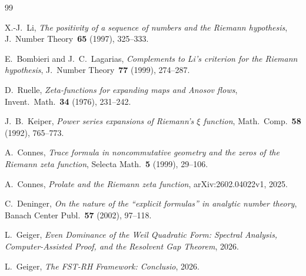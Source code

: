 \documentclass[12pt,a4paper]{article}
\theoremstyle{definition}
\theoremstyle{remark}
\begin{document}
\begin{thebibliography}{99}

X.-J.~Li, \emph{The positivity of a sequence of numbers and the Riemann hypothesis}, J.~Number Theory~\textbf{65} (1997), 325--333.

E.~Bombieri and J.~C.~Lagarias, \emph{Complements to Li's criterion for the Riemann hypothesis}, J.~Number Theory~\textbf{77} (1999), 274--287.

D.~Ruelle, \emph{Zeta-functions for expanding maps and Anosov flows}, Invent.~Math.~\textbf{34} (1976), 231--242.

J.~B.~Keiper, \emph{Power series expansions of Riemann's $\xi$ function}, Math.~Comp.~\textbf{58} (1992), 765--773.

A.~Connes, \emph{Trace formula in noncommutative geometry and the zeros of the Riemann zeta function}, Selecta Math.~\textbf{5} (1999), 29--106.

A.~Connes, \emph{Prolate and the Riemann zeta function}, arXiv:2602.04022v1, 2025.

C.~Deninger, \emph{On the nature of the ``explicit formulas'' in analytic number theory}, Banach Center Publ.~\textbf{57} (2002), 97--118.

L.~Geiger, \emph{Even Dominance of the Weil Quadratic Form: Spectral Analysis, Computer-Assisted Proof, and the Resolvent Gap Theorem}, 2026.

L.~Geiger, \emph{The FST-RH Framework: Conclusio}, 2026.

\end{thebibliography}
\end{document}

